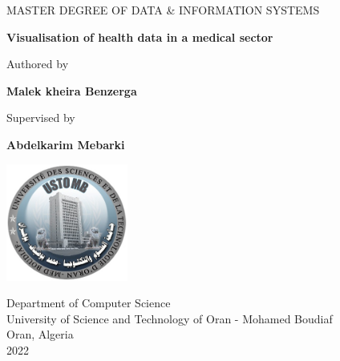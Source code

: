 \begin{titlepage}
    \begin{center}
        MASTER DEGREE OF DATA \& INFORMATION SYSTEMS
        \vspace*{1cm}
 
        {\large
        \textbf{Visualisation of health data in a medical sector}}
 
        \vspace{1cm}
         Authored by
             
        \vspace{0.5cm}
 
        \textbf{Malek kheira Benzerga}


        \vspace{0.5cm}
         Supervised by
             
        \vspace{0.5cm}
 
        \textbf{Abdelkarim Mebarki}
 
        \vfill
             
        
        \vspace{0.8cm}
      
        \includegraphics[width=0.3\textwidth]{images/others/usto.jpg}
             
        \vspace{0.5cm}
        Department of Computer Science\\
        University of Science and Technology of Oran - Mohamed Boudiaf\\
        Oran, Algeria\\
        2022
             
    \end{center}
 \end{titlepage}